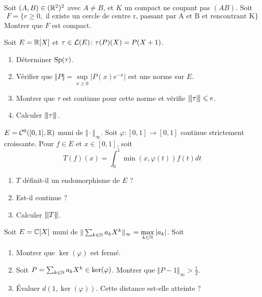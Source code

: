 \begin{exercise}
	Soit $(A,B)\in(\mathbb{R}^{2})^{2}$ avec $A\neq B$, et $K$ un compact ne coupant pas $(AB)$. Soit 
	$$F=\{r\geqslant0,\text{ il existe un cercle de centre r, passant par A et B et rencontrant K}\}$$
	Montrer que $F$ est compact.
\end{exercise}

\begin{exercise}
	Soit $E=\mathbb{R}[X]$ et $\tau\in\mathcal{L}(E)\colon\tau(P)(X)=P(X+1)$.
	\begin{enumerate}
		\item Déterminer $\operatorname{Sp}(\tau)$.
		\item Vérifier que $\Vert P\Vert=\sup\limits_{x\geqslant0}\vert P(x)e^{-x}\vert$ est une norme sur $E$.
		\item Montrer que $\tau$ est continue pour cette norme et vérifie ${\left\vert\kern-0.25ex\left\vert\kern-0.25ex\left\vert{}\tau \right\vert\kern-0.25ex\right\vert\kern-0.25ex\right\vert}\leqslant e$.
		\item Calculer ${\left\vert\kern-0.25ex\left\vert\kern-0.25ex\left\vert{}\tau \right\vert\kern-0.25ex\right\vert\kern-0.25ex\right\vert}$.
	\end{enumerate}
\end{exercise}

\begin{exercise}
	$E=\mathcal{C}^{0}([0,1],\mathbb{R})$ muni de $\Vert\cdot\Vert_{\infty}$. Soit $\varphi\colon[0,1]\to[0,1]$ continue strictement croissante. Pour $f\in E$ et $x\in[0,1]$, soit 
	$$T(f)(x)=\int_{0}^{1}\min(x,\varphi(t))f(t)dt$$
	\begin{enumerate}
		\item $T$ définit-il un endomorphisme de $E$ ?
		\item Est-il continue ?
		\item Calculer ${\left\vert\kern-0.25ex\left\vert\kern-0.25ex\left\vert{}T \right\vert\kern-0.25ex\right\vert\kern-0.25ex\right\vert}$.
	\end{enumerate}
\end{exercise}

\begin{exercise}
	Soit $E=\mathbb{C}[X]$ muni de $\Vert\sum_{k\in\mathbb{N}} a_{k}X^{k}\Vert_{\infty}=\max\limits_{k\in\mathbb{N}}\vert a_{k}\vert$. Soit 
	\phantom{}
	\begin{enumerate}
		\item Montrer que $\ker(\varphi)$ est fermé.
		\item Soit $P=\sum_{k\in\mathbb{N}}a_{k}X^{k}\in\ker(\varphi)$. Montrer que $\Vert P-1\Vert_{\infty}>\frac{1}{2}$.
		\item Évaluer $d(1,\ker(\varphi))$. Cette distance est-elle atteinte ?
	\end{enumerate}
\end{exercise}

